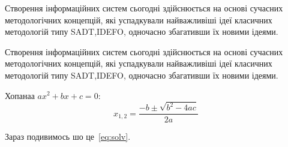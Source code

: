 \documentclass{lib/styles/default-style}
\begin{document}
Створення  інформаційних  систем  сьогодні  здійснюється  
на  основі сучасних  методологічних  концепцій,
які  успадкували  найважливіші  ідеї класичних методологій типу
SADT,IDEFO, одночасно збагативши їх новими ідеями.

Створення  інформаційних  систем  сьогодні  здійснюється  
на  основі сучасних  методологічних  концепцій,
які  успадкували  найважливіші  ідеї класичних методологій типу
SADT,IDEFO, одночасно збагативши їх новими ідеями.

Хопанаа \(ax^2+bx+c=0\):
\begin{equation}\label{eq:solv}
 x_{1,2}=\frac{-b\pm\sqrt{b^2-4ac}}{2a}
\end{equation}
 
Зараз подивимось шо це~\eqref{eq:solv}.
\end{document}
